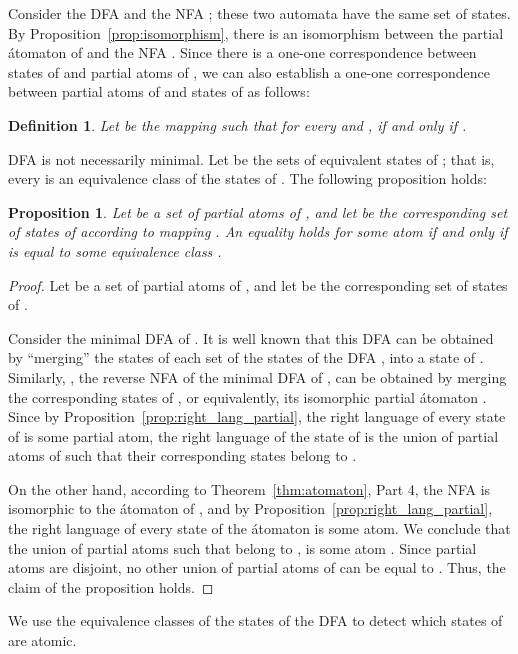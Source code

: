 \documentclass[preprint,12pt]{elsarticle}
\newtheorem{proposition}{Proposition}
\newtheorem{definition}{Definition}
\begin{document}
Consider the DFA  and the NFA ;
these two automata have the same set  of states. 
By Proposition~\ref{prop:isomorphism}, there is an isomorphism 
between the partial \'atomaton  of  and the NFA . 
Since there is a one-one correspondence between states  of 
 and partial atoms  of , we can also establish a one-one 
correspondence  between partial atoms  of  and 
states  of  as follows:

\begin{definition}
\label{def:mapping}
Let  be the mapping such that for every  and 
,  if and only if . 
\end{definition}


DFA  is not necessarily minimal. 
Let  be the sets of equivalent states 
of ; that is, every  is an equivalence class of 
the states of . 
The following proposition holds:

\begin{proposition}
\label{prop:atom_equiv}
Let  be a set of partial atoms of , and 
let  be the corresponding set of states of 
according to mapping .
An equality  holds for some atom  if and only if
 is equal to some equivalence class .  
\end{proposition}
\begin{proof}
Let  be a set of partial atoms of , and 
let  be 
the corresponding set of states of .

Consider the minimal DFA  of .  
It is well known that this DFA can be obtained 
by ``merging'' the states of each set  of the states of the DFA
, into a state  of .
Similarly, , the reverse NFA of the minimal DFA of ,
can be obtained by merging the corresponding states of , 
or equivalently, its isomorphic partial \'atomaton .
Since by Proposition~\ref{prop:right_lang_partial},
the right language of every state of  is some partial atom, 
the right language of the state  of  is
the union of partial atoms  of  such that their corresponding states
 belong to . 

On the other hand, according to Theorem~\ref{thm:atomaton}, Part 4, 
the NFA  is isomorphic to the \'atomaton of , and 
by Proposition~\ref{prop:right_lang_partial},
the right language of every state of the \'atomaton is some atom.
We conclude that the union of partial atoms  such that 
 belong to , is some atom . 
Since partial atoms are disjoint, no other union of partial atoms
of  can be equal to . Thus, the claim of the proposition holds.
\end{proof}


We use the equivalence classes  of the states of 
the DFA  to detect which states of  are atomic.
\end{document}
